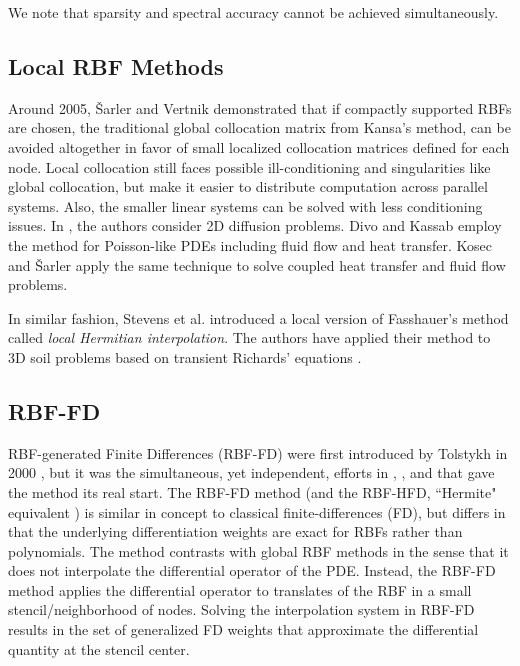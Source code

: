\documentclass{report}
\begin{document}
{We note that sparsity and spectral accuracy cannot be achieved simultaneously. 


\subsection{Local RBF Methods}
Around 2005, \v{S}arler and Vertnik \cite{Sarler2006, Vertnik2006} demonstrated that if compactly supported RBFs are chosen, the traditional global 
collocation matrix from Kansa's method, can be avoided altogether in favor of small localized collocation matrices defined for 
each node. Local collocation still faces possible ill-conditioning and singularities 
like global collocation, but make it easier to distribute computation across parallel systems. Also, the smaller linear systems can be 
solved 
with less conditioning issues. In \cite{Sarler2006}, the authors consider 2D diffusion problems. Divo and Kassab \cite{Divo2007} 
employ the 
method for Poisson-like PDEs including fluid flow and heat transfer. Kosec and \v{S}arler \cite{Kosec2008} apply the 
same technique to solve coupled heat transfer and fluid flow problems.

In similar fashion, Stevens et al. \cite{Stevens2009a} introduced a local version of 
Fasshauer's method called \emph{local Hermitian interpolation}. The authors have applied their method to 3D soil 
problems based on transient Richards' equations \cite{Stevens2008a, Stevens2009a, Stevens2009b}.

\subsection{RBF-FD}

RBF-generated Finite Differences (RBF-FD) were first introduced by Tolstykh in 2000 \cite{Tolstykh2000}, 
but it was the simultaneous, yet independent,
efforts in \cite{Shu2003}, \cite{Tolstykh2003a}, \cite{Wright2003} and \cite{Cecil2004} that gave the method its real start. 
The RBF-FD method (and the RBF-HFD, ``Hermite" equivalent \cite{WrightFornberg06}) is similar in concept to classical 
finite-differences (FD), but differs in that the underlying differentiation 
weights are exact for RBFs rather than polynomials. The method contrasts with global RBF methods in the sense that it does not interpolate the differential operator of the PDE. Instead, the RBF-FD method applies the differential operator to translates of the RBF in a small stencil/neighborhood of nodes. Solving the interpolation system in RBF-FD results in the set of generalized FD weights that approximate the differential quantity at the stencil center.

}
\end{document}
